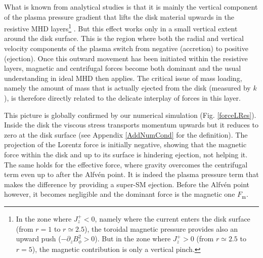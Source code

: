 \documentclass{aa}
\begin{document}
What is known from analytical studies is that it is mainly the vertical component of the plasma pressure gradient that lifts the disk material upwards in the resistive MHD layers\footnote{In the zone
where $J_z^+<0$, namely where the current enters the disk surface (from $r=1$ to $r \simeq 2.5$), the toroidal magnetic pressure provides also an upward push ($- \partial_z B^2_\phi >0$). But in the
zone where $J_z^+>0$ (from $r \simeq 2.5$ to $r=5$), the magnetic contribution is only a vertical pinch.}  \citep{1995A&A...295..807F,1997A&A...319..340F}. But this effect works only in a small
vertical extent around the disk surface. This is the region where both the radial and vertical velocity components of the plasma switch from negative (accretion) to positive (ejection). Once this
outward movement has been initiated within the resistive layers, magnetic and centrifugal forces become both dominant and the usual understanding in ideal MHD then applies. The critical issue of mass
loading, namely the amount of mass that is actually ejected from the disk (measured by $k$), is therefore directly related to the delicate interplay of forces in this layer.

This picture is globally confirmed by our numerical simulation (Fig. \ref{forceLRes}). Inside the disk the viscous stress transports momentum upwards but it reduces to zero at the disk surface (see
Appendix \ref{AddNumCond} for the definition).  The projection of the Lorentz force is initially negative, showing that the magnetic force within the disk and up to its surface is hindering ejection,
not helping it. The same holds for the effective force, where gravity overcomes the centrifugal term even up to after the Alfv\'en point. It is indeed the plasma pressure term that makes the
difference by providing a super-SM ejection. Before the Alfv\'en point however, it becomes negligible and the dominant force is the magnetic one $F_\mathrm{m}$.
\end{document}
